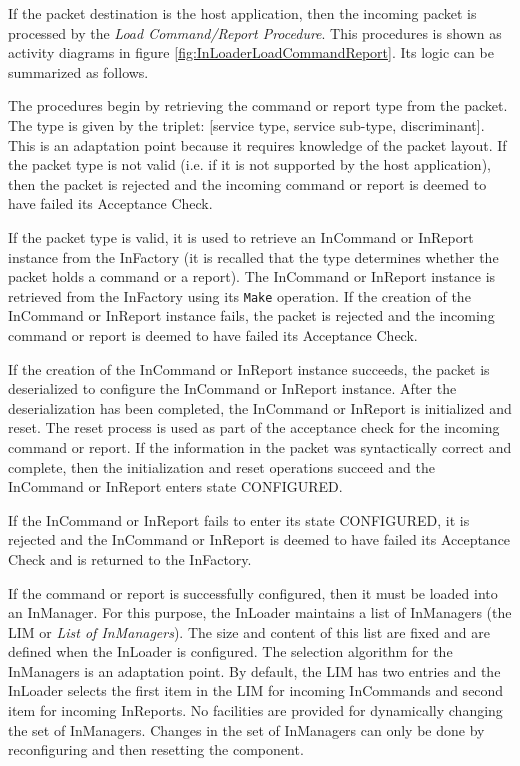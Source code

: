 If the packet destination is the host application, then the incoming packet is processed by the \textit{Load Command/Report Procedure}. This procedures is shown as activity diagrams in figure \ref{fig:InLoaderLoadCommandReport}. Its logic can be summarized as follows.

The procedures begin by retrieving the command or report type from the packet. The type is given by the triplet: [service type, service sub-type, discriminant]. This is an adaptation point because it requires knowledge of the packet layout. If the packet type is not valid (i.e. if it is not supported by the host application), then the packet is rejected and the incoming command or report is deemed to have failed its Acceptance Check.

If the packet type is valid, it is used to retrieve an InCommand or InReport instance from the InFactory (it is recalled that the type determines whether the packet holds a command or a report). The InCommand or InReport instance is retrieved from the InFactory using its \texttt{Make} operation. If the creation of the InCommand or InReport instance fails, the packet is rejected and the incoming command or report is deemed to have failed its Acceptance Check.

If the creation of the InCommand or InReport instance succeeds, the packet is deserialized to configure the InCommand or InReport instance. After the deserialization has been completed, the InCommand or InReport is initialized and reset. The reset process is used as part of the acceptance check for the incoming command or report. If the information in the packet was syntactically correct and complete, then the initialization and reset operations succeed and the InCommand or InReport enters state CONFIGURED.

If the InCommand or InReport fails to enter its state CONFIGURED, it is rejected and the InCommand or InReport is deemed to have failed its Acceptance Check and is returned to the InFactory.

If the command or report is successfully configured, then it must be loaded into an InManager. For this purpose, the InLoader maintains a list of InManagers (the LIM or \textit{List of InManagers}). The size and content of this list are fixed and are defined when the InLoader is configured. The selection algorithm for the InManagers is an adaptation point. By default, the LIM has two entries and the InLoader selects the first item in the LIM for incoming InCommands and second item for incoming InReports. 
No facilities are provided for dynamically changing the set of InManagers. Changes in the set of InManagers can only be done by reconfiguring and then resetting the component.

